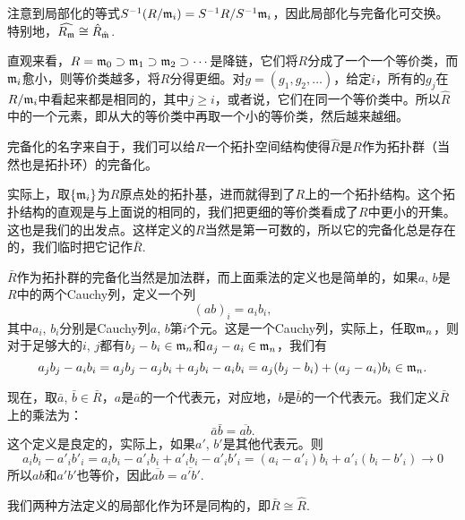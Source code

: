 注意到局部化的等式$S^{-1}(R/\mathfrak{m}_i)=S^{-1}R/S^{-1}\mathfrak{m}_i$，因此局部化与完备化可交换。特别地，$\widehat{R_{\mathfrak{m}}}\cong \hat{R}_{\hat{\mathfrak{m}}}$.

直观来看，$R=\mathfrak{m}_0\supset \mathfrak{m}_1\supset \mathfrak{m}_2\supset \cdots$是降链，它们将$R$分成了一个一个等价类，而$\mathfrak{m}_i$愈小，则等价类越多，将$R$分得更细。对$g=(g_1,g_2,\dots)$，给定$i$，所有的$g_j$在$R/\mathfrak{m}_i$中看起来都是相同的，其中$j\geq i$，或者说，它们在同一个等价类中。所以$\hat R$中的一个元素，即从大的等价类中再取一个小的等价类，然后越来越细。

\begin{para}
完备化的名字来自于，我们可以给$R$一个拓扑空间结构使得$\hat R$是$R$作为拓扑群（当然也是拓扑环）的完备化。

实际上，取$\{\mathfrak{m}_i\}$为$R$原点处的拓扑基，进而就得到了$R$上的一个拓扑结构。这个拓扑结构的直观是与上面说的相同的，我们把更细的等价类看成了$R$中更小的开集。这也是我们的出发点。这样定义的$R$当然是第一可数的，所以它的完备化总是存在的，我们临时把它记作$\bar{R}$. 

$\bar{R}$作为拓扑群的完备化当然是加法群，而上面乘法的定义也是简单的，如果$a$, $b$是$R$中的两个Cauchy列，定义一个列
\[
	(ab)_i=a_ib_i,
\]
其中$a_i$, $b_i$分别是Cauchy列$a$, $b$第$i$个元。这是一个Cauchy列，实际上，任取$\mathfrak{m}_n$，则对于足够大的$i$, $j$都有$b_j-b_i\in \mathfrak{m}_n$和$a_j-a_i\in \mathfrak{m}_n$，我们有
\[
	a_jb_j-a_ib_i=a_jb_j-a_jb_i+a_jb_i-a_ib_i=a_j(b_j-b_i)+(a_j-a_i)b_i\in \mathfrak{m}_n.
\]

现在，取$\bar{a}$, $\bar{b}\in \bar{R}$，$a$是$\bar{a}$的一个代表元，对应地，$b$是$\bar{b}$的一个代表元。我们定义$\bar{R}$上的乘法为：
\[
	\bar{a}\bar{b}=\overline{ab}.
\]
这个定义是良定的，实际上，如果$a'$, $b'$是其他代表元。则
\[
	a_ib_i-a'_ib'_i=a_ib_i-a'_ib_i+a'_ib_i-a'_ib'_i=(a_i-a'_i)b_i+a'_i(b_i-b'_i)\to 0
\]
所以$ab$和$a'b'$也等价，因此$\overline{ab}=\overline{a'b'}$.
\end{para}

\begin{pro}
	我们两种方法定义的局部化作为环是同构的，即$\bar{R}\cong \hat R$.
\end{pro}

